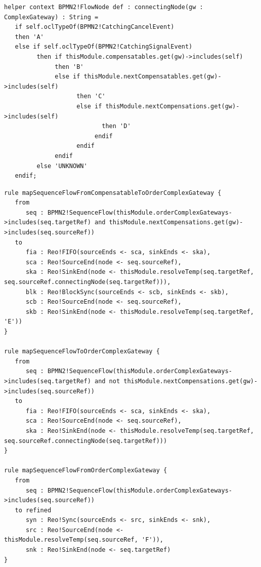 \begin{lstlisting}[float,frame=single,caption=Finding the connecting node to a complex gateway,label=lst:fromcomplexgwtype1hlpr]
helper context BPMN2!FlowNode def : connectingNode(gw : ComplexGateway) : String =
   if self.oclTypeOf(BPMN2!CatchingCancelEvent)
   then 'A'
   else if self.oclTypeOf(BPMN2!CatchingSignalEvent)
         then if thisModule.compensatables.get(gw)->includes(self)  
              then 'B'
              else if thisModule.nextCompensatables.get(gw)->includes(self)
                    then 'C'
                    else if thisModule.nextCompensations.get(gw)->includes(self)
                           then 'D'
                         endif  
                    endif
              endif
         else 'UNKNOWN'
   endif;
\end{lstlisting}
 

\begin{lstlisting}[float,frame=single,caption=Mapping incoming flows of the compensation order gateway,label=lst:fromcomplexgwtype1]
rule mapSequenceFlowFromCompensatableToOrderComplexGateway {
   from
      seq : BPMN2!SequenceFlow(thisModule.orderComplexGateways->includes(seq.targetRef) and thisModule.nextCompensations.get(gw)->includes(seq.sourceRef))
   to 
      fia : Reo!FIFO(sourceEnds <- sca, sinkEnds <- ska),
      sca : Reo!SourceEnd(node <- seq.sourceRef),
      ska : Reo!SinkEnd(node <- thisModule.resolveTemp(seq.targetRef, seq.sourceRef.connectingNode(seq.targetRef))),
      blk : Reo!BlockSync(sourceEnds <- scb, sinkEnds <- skb),
      scb : Reo!SourceEnd(node <- seq.sourceRef),
      skb : Reo!SinkEnd(node <- thisModule.resolveTemp(seq.targetRef, 'E'))
}

rule mapSequenceFlowToOrderComplexGateway {
   from
      seq : BPMN2!SequenceFlow(thisModule.orderComplexGateways->includes(seq.targetRef) and not thisModule.nextCompensations.get(gw)->includes(seq.sourceRef))
   to 
      fia : Reo!FIFO(sourceEnds <- sca, sinkEnds <- ska),
      sca : Reo!SourceEnd(node <- seq.sourceRef),
      ska : Reo!SinkEnd(node <- thisModule.resolveTemp(seq.targetRef, seq.sourceRef.connectingNode(seq.targetRef)))
}

rule mapSequenceFlowFromOrderComplexGateway {
   from
      seq : BPMN2!SequenceFlow(thisModule.orderComplexGateways->includes(seq.sourceRef))
   to refined 
      syn : Reo!Sync(sourceEnds <- src, sinkEnds <- snk),
      src : Reo!SourceEnd(node <- thisModule.resolveTemp(seq.sourceRef, 'F')),
      snk : Reo!SinkEnd(node <- seq.targetRef)
}
\end{lstlisting}

